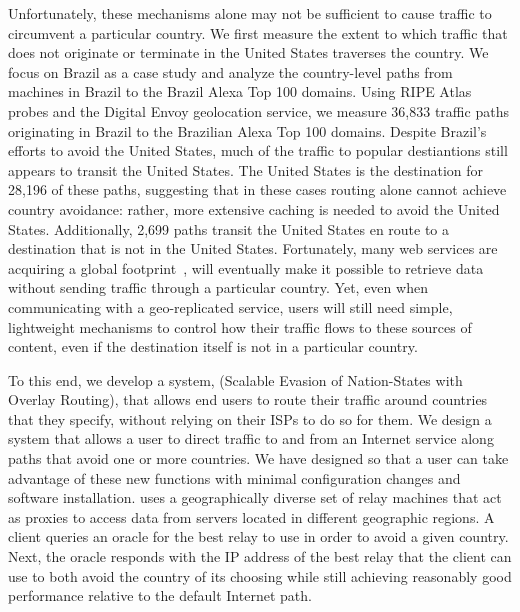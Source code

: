Unfortunately, these mechanisms alone may not be sufficient to cause
traffic to circumvent a particular country. 
We first measure the extent to which traffic that does not
originate or terminate in the United States traverses the country. We
focus on Brazil as a case study and analyze the country-level paths from
machines in Brazil to the Brazil Alexa Top 100 domains. Using RIPE Atlas
probes and the Digital Envoy geolocation service, we measure 36,833
traffic paths originating in Brazil to the Brazilian Alexa Top 100
domains. Despite Brazil's efforts to avoid the United States, much of
the traffic to popular destiantions still appears to transit the United
States. The United States is the destination for 28,196 of these paths,
suggesting that in these cases routing alone cannot achieve country
avoidance: rather, more extensive caching is needed to avoid the United
States. Additionally, 2,699 paths transit the United States en route to
a destination that is not in the United States.  Fortunately, many web
services are acquiring a global footprint~\cite{eu_datacenters}, will
eventually make it possible to retrieve data without sending traffic
through a particular country. Yet, even when communicating with a
geo-replicated service, users will still need simple, lightweight
mechanisms to control how their traffic flows to these sources of
content, even if the destination itself is not in a particular country.

To this end, we develop a system, \system{} (Scalable Evasion of
Nation-States with Overlay Routing), that allows end users to
route their traffic around countries that they specify, without relying
on their ISPs to do so for them. We design a system that allows a user
to direct traffic to and from an Internet service along paths that avoid
one or more countries. We have designed \system{} so that a user can
take advantage of these new functions with minimal configuration changes
and software installation.  \system{} uses a geographically diverse set
of relay machines that act as proxies to access data from servers
located in different geographic regions.  A client queries an oracle for
the best relay to use in order to avoid a given country.  Next, the
oracle responds with the IP address of the best relay that the client
can use to both avoid the country of its choosing while still achieving
reasonably good performance relative to the default Internet path.

